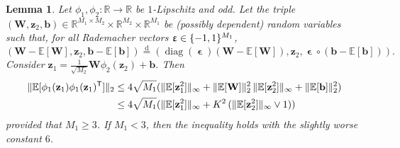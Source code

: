 \documentclass[twoside]{article}
\newcommand{\vb}{\mathbf{b}}
\newcommand{\vz}{\mathbf{z}}
\newcommand{\vep}{\bm{\upvarepsilon}}
\newcommand{\mW}{\mathbf{W}}
\newcommand{\E}{\mathbb{E}}
\newcommand{\R}{\mathbb{R}}
\newcommand{\T}{\text{\textsf{T}}}
\newcommand{\disteq}{\overset{\text{d}}{=}}
\newcommand{\opspace}{}
\newcommand{\diag}{\operatorname{diag}\opspace}
\newcommand{\had}{\circ}
\DeclarePairedDelimiter\set{\{}{\}}              %
\DeclarePairedDelimiter\norm{\|}{\|}             %
\theoremstyle{theoremstyle}
\newtheorem{lemma}[theorem]{Lemma}
\begin{document}
\begin{lemma} \label{lem:outer}
    Let $\phi_1,\phi_2\colon\R \to \R$ be $1$-Lipschitz and odd.
    Let the triple $(\mW, \vz_2, \vb) \in \R^{M_1\times M_2} \times \R^{M_2} \times \R^{M_1}$ be (possibly dependent) random variables such that, for all Rademacher vectors $\vep \in \set{-1, 1}^{M_1}$,
    \begin{equation}
        (\mW - \E[\mW], \vz_2, \vb - \E[\vb])
        \disteq
        (\diag(\vep)(\mW - \E[\mW]), \vz_2, \vep \had (\vb - \E[\vb])).
    \end{equation}
    Consider $\vz_1 = \tfrac1{\sqrt{M_2}}\mW \phi_2(\vz_2) + \vb$.
    Then
    \begin{align}
        \norm{\E[\phi_1(\vz_1) \phi_1(\vz_1)^\T]}_2
        &\le
            4\sqrt{M_1}(
                \norm{\E[\vz_1^2]}_\infty
                + \norm{\E[\mW]}_2^2\, \norm{\E[\vz_{2}^2]}_\infty
                + \norm{\E[\vb]}_2^2
            )\\
        &\le
            4\sqrt{M_1}(
                \norm{\E[\vz_1^2]}_\infty
                + K^2\, (\norm{\E[\vz_{2}^2]}_\infty \lor 1)
            )
    \end{align}
    provided that $M_1 \ge 3$. %
    If $M_1 < 3$, then the inequality holds with the slightly worse constant $6$.
\end{lemma}
\end{document}
